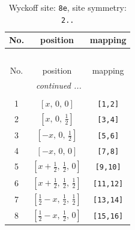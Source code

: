 \documentclass[fleqn,8pt]{jsarticle}
\begin{document}
\renewcommand{\arraystretch}{1.2}
\begin{longtable}{ccc}
\caption{Wyckoff site: {\tt 8e}, site symmetry: {\tt 2..}}
 \\
 \hline \hline
No. & position & mapping \\ \hline \endfirsthead

\multicolumn{2}{l}{\tablename\ \thetable{}} \\
 \hline \hline
No. & position & mapping \\ \hline \endhead

 \hline \hline
\multicolumn{2}{r}{\footnotesize\it continued ...} \\ \endfoot

 \hline \hline
\multicolumn{2}{r}{} \\ \endlastfoot

1 & $\left[ x,\, 0,\, 0 \right]$ & {\tt [1,2]} \\ \hline
2 & $\left[ x,\, 0,\, \frac{1}{2} \right]$ & {\tt [3,4]} \\ \hline
3 & $\left[ - x,\, 0,\, \frac{1}{2} \right]$ & {\tt [5,6]} \\ \hline
4 & $\left[ - x,\, 0,\, 0 \right]$ & {\tt [7,8]} \\ \hline
5 & $\left[ x + \frac{1}{2},\, \frac{1}{2},\, 0 \right]$ & {\tt [9,10]} \\ \hline
6 & $\left[ x + \frac{1}{2},\, \frac{1}{2},\, \frac{1}{2} \right]$ & {\tt [11,12]} \\ \hline
7 & $\left[ \frac{1}{2} - x,\, \frac{1}{2},\, \frac{1}{2} \right]$ & {\tt [13,14]} \\ \hline
8 & $\left[ \frac{1}{2} - x,\, \frac{1}{2},\, 0 \right]$ & {\tt [15,16]} \\
\end{longtable}
\renewcommand{\arraystretch}{1.2}
\end{document}
